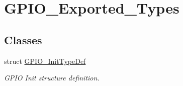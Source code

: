 \hypertarget{group___g_p_i_o___exported___types}{}\section{G\+P\+I\+O\+\_\+\+Exported\+\_\+\+Types}
\label{group___g_p_i_o___exported___types}
\subsection*{Classes}
\begin{DoxyCompactItemize}
\item 
struct \hyperlink{struct_g_p_i_o___init_type_def}{G\+P\+I\+O\+\_\+\+Init\+Type\+Def}
\begin{DoxyCompactList}\small\item\em G\+P\+IO Init structure definition. \end{DoxyCompactList}\end{DoxyCompactItemize}
